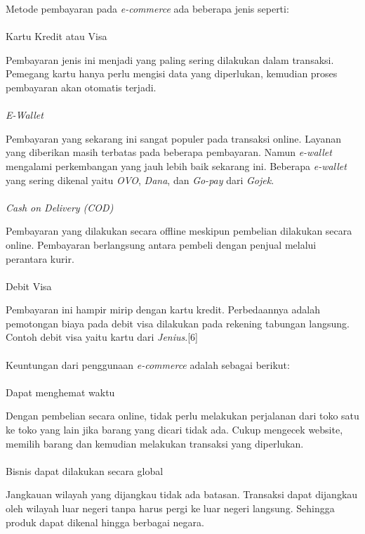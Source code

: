 \par Metode pembayaran pada \textit{e-commerce} ada beberapa jenis seperti:	\\\\
Kartu Kredit atau Visa\\
\par Pembayaran jenis ini menjadi yang paling sering dilakukan dalam transaksi. Pemegang kartu hanya perlu mengisi data yang diperlukan, kemudian proses pembayaran akan otomatis terjadi. \\\\
\textit{E-Wallet}\\
\par Pembayaran yang sekarang ini sangat populer pada transaksi online. Layanan yang diberikan masih terbatas pada beberapa pembayaran. Namun \textit{e-wallet} mengalami perkembangan yang jauh lebih baik sekarang ini. Beberapa \textit{e-wallet} yang sering dikenal yaitu \textit{OVO}, \textit{Dana}, dan \textit{Go-pay} dari \textit{Gojek}. \\\\
\textit{Cash on Delivery (COD)}\\
\par Pembayaran yang dilakukan secara offline meskipun pembelian dilakukan secara online. Pembayaran berlangsung antara pembeli dengan penjual melalui perantara kurir. \\\\
Debit Visa\\
\par Pembayaran ini hampir mirip dengan kartu kredit. Perbedaannya adalah pemotongan biaya pada debit visa dilakukan pada rekening tabungan langsung. Contoh debit visa yaitu kartu dari \textit{Jenius}.[6]\\\\
Keuntungan dari penggunaan \textit{e-commerce} adalah sebagai berikut:\\\\
Dapat menghemat waktu \\
\par Dengan pembelian secara online, tidak perlu melakukan perjalanan dari toko satu ke toko yang lain jika barang yang dicari tidak ada. Cukup mengecek website, memilih barang dan kemudian melakukan transaksi yang diperlukan. \\\\
Bisnis dapat dilakukan secara global \\
\par Jangkauan wilayah yang dijangkau tidak ada batasan. Transaksi dapat dijangkau oleh wilayah luar negeri tanpa harus pergi ke luar negeri langsung. Sehingga produk dapat dikenal hingga berbagai negara.\\\\
